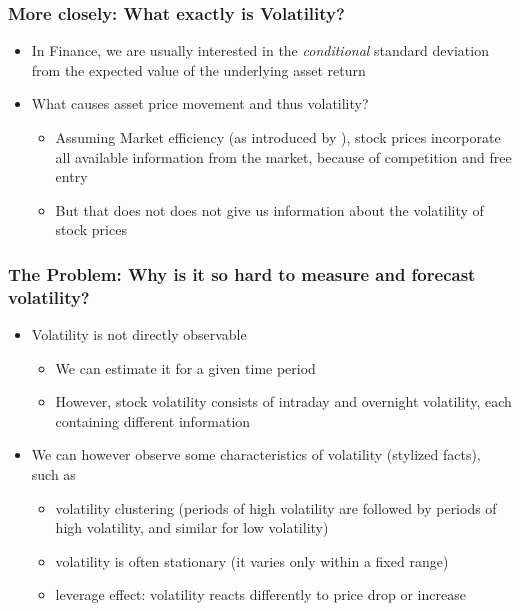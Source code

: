 \documentclass[aspectratio=169]{beamer}
\begin{document}
\begin{frame}
\frametitle{More closely: What exactly is Volatility?}
	\begin{itemize}
	\item In Finance, we are usually interested in the \textit{conditional} standard deviation from the expected value of the underlying asset return \parencite{tsay2005}
	\item What causes asset price movement and thus volatility?
		\begin{itemize}
		\item Assuming Market efficiency (as introduced by \citeauthor{fama1970}), stock prices incorporate all available information from the market, because of competition and free entry 
		\item But that does not does not give us information about the volatility of stock prices
		\end{itemize}
	\end{itemize}
\end{frame}

\begin{frame}
\frametitle{The Problem: Why is it so hard to measure and forecast volatility?}
	\begin{itemize}
	\item Volatility is not directly observable
		\begin{itemize}
		\item We can estimate it for a given time period 
		\item However, stock volatility consists of intraday and overnight volatility, each containing different information
		\end{itemize}
	\item We can however observe some characteristics of volatility (stylized facts), such as
		\begin{itemize}
		\item volatility clustering (periods of high volatility are followed by periods of high volatility, and similar for low volatility)
		\item volatility is often stationary (it varies only within a fixed range)
		\item leverage effect: volatility reacts differently to price drop or increase
		\end{itemize}
	\end{itemize}
\end{frame}
\end{document}
